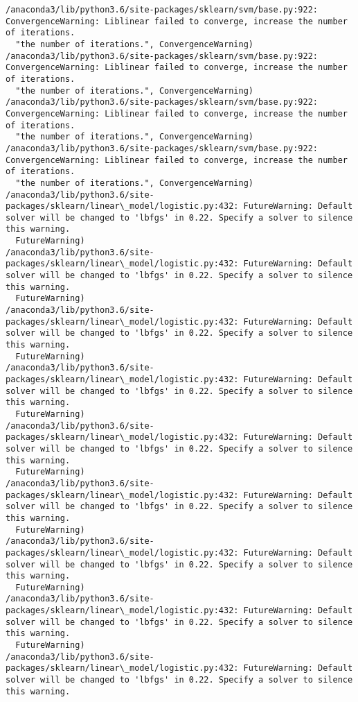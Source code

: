 \documentclass[11pt]{article}
\begin{document}
\begin{Verbatim}[commandchars=\\\{\}]
/anaconda3/lib/python3.6/site-packages/sklearn/svm/base.py:922: ConvergenceWarning: Liblinear failed to converge, increase the number of iterations.
  "the number of iterations.", ConvergenceWarning)
/anaconda3/lib/python3.6/site-packages/sklearn/svm/base.py:922: ConvergenceWarning: Liblinear failed to converge, increase the number of iterations.
  "the number of iterations.", ConvergenceWarning)
/anaconda3/lib/python3.6/site-packages/sklearn/svm/base.py:922: ConvergenceWarning: Liblinear failed to converge, increase the number of iterations.
  "the number of iterations.", ConvergenceWarning)
/anaconda3/lib/python3.6/site-packages/sklearn/svm/base.py:922: ConvergenceWarning: Liblinear failed to converge, increase the number of iterations.
  "the number of iterations.", ConvergenceWarning)
/anaconda3/lib/python3.6/site-packages/sklearn/linear\_model/logistic.py:432: FutureWarning: Default solver will be changed to 'lbfgs' in 0.22. Specify a solver to silence this warning.
  FutureWarning)
/anaconda3/lib/python3.6/site-packages/sklearn/linear\_model/logistic.py:432: FutureWarning: Default solver will be changed to 'lbfgs' in 0.22. Specify a solver to silence this warning.
  FutureWarning)
/anaconda3/lib/python3.6/site-packages/sklearn/linear\_model/logistic.py:432: FutureWarning: Default solver will be changed to 'lbfgs' in 0.22. Specify a solver to silence this warning.
  FutureWarning)
/anaconda3/lib/python3.6/site-packages/sklearn/linear\_model/logistic.py:432: FutureWarning: Default solver will be changed to 'lbfgs' in 0.22. Specify a solver to silence this warning.
  FutureWarning)
/anaconda3/lib/python3.6/site-packages/sklearn/linear\_model/logistic.py:432: FutureWarning: Default solver will be changed to 'lbfgs' in 0.22. Specify a solver to silence this warning.
  FutureWarning)
/anaconda3/lib/python3.6/site-packages/sklearn/linear\_model/logistic.py:432: FutureWarning: Default solver will be changed to 'lbfgs' in 0.22. Specify a solver to silence this warning.
  FutureWarning)
/anaconda3/lib/python3.6/site-packages/sklearn/linear\_model/logistic.py:432: FutureWarning: Default solver will be changed to 'lbfgs' in 0.22. Specify a solver to silence this warning.
  FutureWarning)
/anaconda3/lib/python3.6/site-packages/sklearn/linear\_model/logistic.py:432: FutureWarning: Default solver will be changed to 'lbfgs' in 0.22. Specify a solver to silence this warning.
  FutureWarning)
/anaconda3/lib/python3.6/site-packages/sklearn/linear\_model/logistic.py:432: FutureWarning: Default solver will be changed to 'lbfgs' in 0.22. Specify a solver to silence this warning.

\end{Verbatim}
\end{document}
